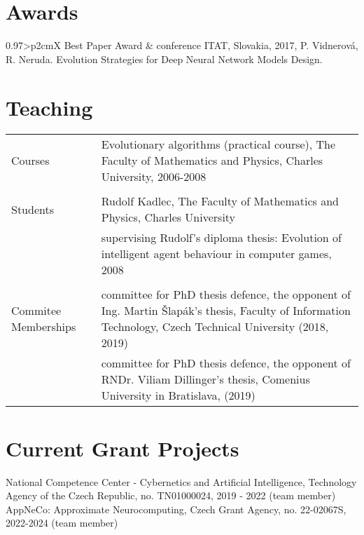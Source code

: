 \documentclass[a4paper, oneside, final]{scrartcl} %
\newcommand{\gray}{\rowcolor[gray]{.90}} %
\begin{document}

\section{Awards}
\begin{tabularx}{0.97\linewidth}{>{\raggedleft}p{2cm}X}
  Best Paper Award & conference ITAT, Slovakia, 2017, P. Vidnerov\'a, R. Neruda. Evolution Strategies for Deep Neural Network Models Design. \\ 
\end{tabularx}

\section{Teaching}
\begin{tabularx}{0.97\linewidth}{>{\raggedleft}p{2cm}X}
\gray Courses &   Evolutionary algorithms (practical course), The Faculty of Mathematics and Physics, Charles University,
2006-2008 \\
\\
\gray Students & Rudolf Kadlec, The Faculty of Mathematics and Physics, Charles University \\
&  supervising Rudolf's diploma thesis: Evolution of intelligent agent behaviour in computer games,
    2008 \\
\\
\gray Commitee Memberships & 
    committee for PhD thesis defence, the opponent of Ing. Martin \v{S}lap\'ak's thesis,
    Faculty of Information Technology, Czech Technical University (2018, 2019) \\
\ & committee for PhD thesis defence, the opponent of RNDr. Viliam Dillinger's thesis,
    Comenius University in Bratislava, (2019) \\
\end{tabularx}

\section{Current Grant Projects}
 National Competence Center - Cybernetics and Artificial Intelligence,
 Technology Agency of the Czech Republic, no. TN01000024, 2019 - 2022 (team member) 
 \newline
 AppNeCo: Approximate Neurocomputing,
 Czech Grant Agency, no. 22-02067S, 2022-2024 (team member)
\end{document}
